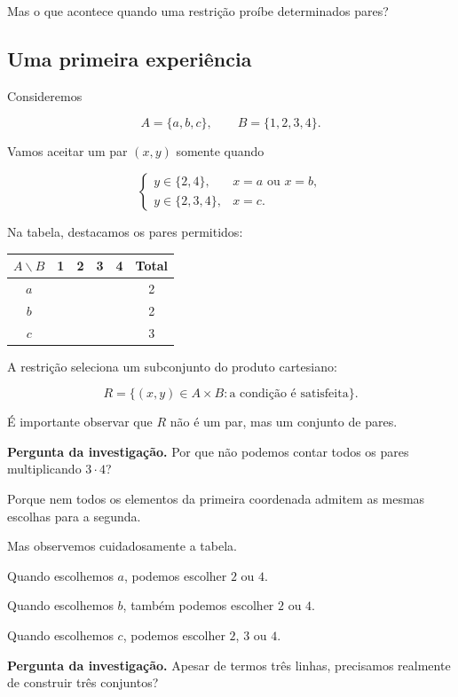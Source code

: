 \documentclass[11pt,a4paper,oneside]{book}
\newcommand{\Pergunta}[1]{\begin{perguntabox}\textbf{Pergunta da investigação.} #1\end{perguntabox}}
\newcommand{\ccel}[1]{\cellcolor{green!13}{#1}}
\newcommand{\ecel}[1]{\cellcolor{red!11}{#1}}
\begin{document}
Mas o que acontece quando uma restrição
proíbe determinados pares?

\subsection*{Uma primeira experiência}

Consideremos

\[
A=\{a,b,c\},\qquad B=\{1,2,3,4\}.
\]

Vamos aceitar um par $(x,y)$ somente quando

\[
\begin{cases}
y\in\{2,4\},&x=a\text{ ou }x=b,\\
y\in\{2,3,4\},&x=c.
\end{cases}
\]

Na tabela, destacamos os pares permitidos:

\begin{center}
\small
\begin{tabular}{c|cccc|c}
$A\backslash B$&1&2&3&4&Total\\
\hline
$a$&
\ecel{$(a,1)$}&
\ccel{$(a,2)$}&
\ecel{$(a,3)$}&
\ccel{$(a,4)$}&2\\
$b$&
\ecel{$(b,1)$}&
\ccel{$(b,2)$}&
\ecel{$(b,3)$}&
\ccel{$(b,4)$}&2\\
$c$&
\ecel{$(c,1)$}&
\ccel{$(c,2)$}&
\ccel{$(c,3)$}&
\ccel{$(c,4)$}&3
\end{tabular}
\end{center}

A restrição seleciona um subconjunto
do produto cartesiano:

\[
R=\{(x,y)\in A\times B:
\text{a condição é satisfeita}\}.
\]

É importante observar que $R$
não é um par, mas um conjunto de pares.

\Pergunta{Por que não podemos contar
todos os pares multiplicando $3\cdot4$?}

Porque nem todos os elementos da
primeira coordenada admitem
as mesmas escolhas para a segunda.

Mas observemos cuidadosamente a tabela.

Quando escolhemos $a$, podemos
escolher $2$ ou $4$.

Quando escolhemos $b$, também
podemos escolher $2$ ou $4$.

Quando escolhemos $c$, podemos
escolher $2$, $3$ ou $4$.

\Pergunta{Apesar de termos três
linhas, precisamos realmente
de construir três conjuntos?}
\end{document}
